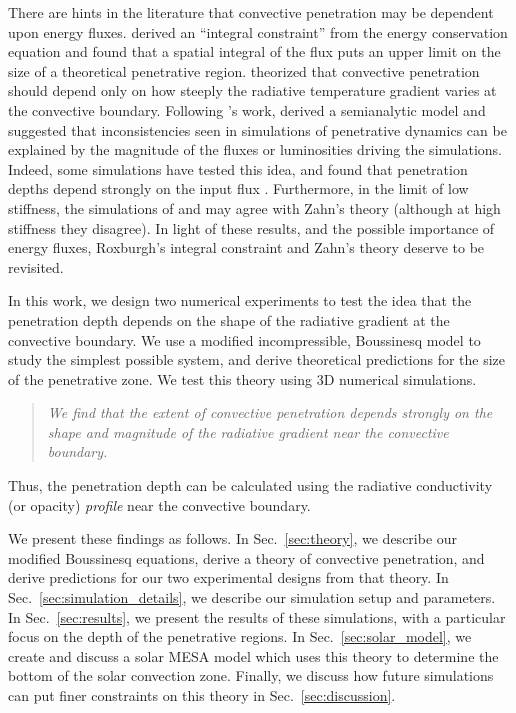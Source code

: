 \documentclass[twocolumn]{aastex631}
\begin{document}
There are hints in the literature that convective penetration may be dependent upon energy fluxes.
\citet{roxburgh1978, roxburgh1989, roxburgh1992, roxburgh1998} derived an ``integral constraint'' from the energy conservation equation and found that a spatial integral of the flux puts an upper limit on the size of a theoretical penetrative region.
\citet{zahn1991} theorized that convective penetration should depend only on how steeply the radiative temperature gradient varies at the convective boundary.
Following \citet{zahn1991}'s work, \citet{rempel2004} derived a semianalytic model and suggested that inconsistencies seen in simulations of penetrative dynamics can be explained by the magnitude of the fluxes or luminosities driving the simulations.
Indeed, some simulations have tested this idea, and found that penetration depths depend strongly on the input flux \citep{singh_etal_1998, kapyla_etal_2007, tian_etal_2009, hotta2017, kapyla2019}.
Furthermore, in the limit of low stiffness, the simulations of \citet{hurlburt_etal_1994} and \citet{rogers_glatzmaier_2005} may agree with Zahn's theory (although at high stiffness they disagree).
In light of these results, and the possible importance of energy fluxes, Roxburgh's integral constraint and Zahn's theory deserve to be revisited.

In this work, we design two numerical experiments to test the idea that the penetration depth depends on the shape of the radiative gradient at the convective boundary.
We use a modified incompressible, Boussinesq model to study the simplest possible system, and derive theoretical predictions for the size of the penetrative zone.
We test this theory using 3D numerical simulations.
\begin{quote}
\emph{
We find that the extent of convective penetration depends strongly on the shape and magnitude of the radiative gradient near the convective boundary.
}
\end{quote}
Thus, the penetration depth can be calculated using the radiative conductivity (or opacity) \emph{profile} near the convective boundary.

We present these findings as follows.
In Sec.~\ref{sec:theory}, we describe our modified Boussinesq equations, derive a theory of convective penetration, and derive predictions for our two experimental designs from that theory.
In Sec.~\ref{sec:simulation_details}, we describe our simulation setup and parameters.
In Sec.~\ref{sec:results}, we present the results of these simulations, with a particular focus on the depth of the penetrative regions.
In Sec.~\ref{sec:solar_model}, we create and discuss a solar MESA model which uses this theory to determine the bottom of the solar convection zone.
Finally, we discuss how future simulations can put finer constraints on this theory in Sec.~\ref{sec:discussion}.
\end{document}
